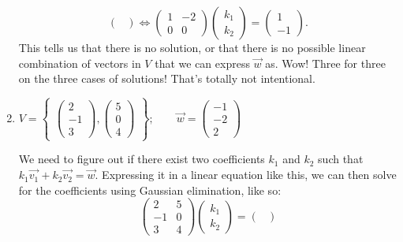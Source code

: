 \documentclass{article}
\begin{document}
\begin{enumerate}
\begin{solution}
\[\begin{pmatrix}
            \end{pmatrix} \Longleftrightarrow \begin{pmatrix}
                1&-2 \\ 0&0
            \end{pmatrix}\begin{pmatrix}
                k_1\\k_2
            \end{pmatrix} = \begin{pmatrix}
                1\\-1
            \end{pmatrix}.
        \] This tells us that there is no solution, or that there is no possible linear combination of vectors in \(V\) that we can express \(\overrightarrow{w}\) as. Wow! Three for three on the three cases of solutions! That's totally not intentional. 
    \end{solution}
    \item \(V = \begin{Bmatrix}
        \begin{pmatrix}
            2\\-1\\3
        \end{pmatrix},\begin{pmatrix}
            5\\0\\4
        \end{pmatrix}
    \end{Bmatrix}; \qquad \overrightarrow{w} = \begin{pmatrix}
        -1\\-2\\2
    \end{pmatrix}\)\begin{solution}
        We need to figure out if there exist two coefficients \(k_1\) and \(k_2\) such that \(k_1\overrightarrow{v_1} + k_2\overrightarrow{v_2} = \overrightarrow{w}\).
        Expressing it in a linear equation like this, we can then solve for the coefficients using Gaussian elimination, like so:\[
            \begin{pmatrix}
                2&5\\-1&0\\3&4
            \end{pmatrix}\begin{pmatrix}
                k_1\\k_2
            \end{pmatrix} = \begin{pmatrix}

\end{pmatrix}\]
\end{solution}
\end{enumerate}
\end{document}
